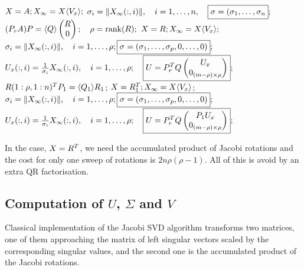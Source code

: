 \documentclass{article}
\begin{document}
\begin{algorithm}
  \caption{$(\sigma,U) = \texttt{svd}(A)$} \label{alg:svd-sv-lhsvec}
  \begin{algorithmic}[1]
    \State $X = A; X_{\infty} = X\langle V_x\rangle;$
    \State $\sigma_i = \|{X_{\infty}(:,i)}\|, \quad i = 1,\dots,n,\quad 
    \boxed{\sigma = (\sigma_1,\dots,\sigma_n};$
\Else
    \State $(P_rA)P = \langle Q\rangle \begin{pmatrix} R \\ 0 \end{pmatrix}; \quad
    \rho = \operatorname{rank}(R);$  
        \State $X = R; X_{\infty} = X\langle V_x\rangle;$
        \State $\sigma_i = \|{X_{\infty}(:,i)}\|, \quad i = 1,\dots,\rho; 
\boxed{\sigma = (\sigma_1,\dots,\sigma_p,0,\dots,0)};$ 
        \State $U_x(:,i) = \frac{1}{\sigma_i}X_{\infty}(:,i),\quad i =
        1,\dots,\rho; \quad \boxed{U = P_r^{T} Q
        \begin{pmatrix}
          U_x \\ 0_{(m-\rho) \times \rho}
        \end{pmatrix}};$
    \Else 
        \State $R(1:\rho,1:n)^TP_1 = \langle Q_1\rangle R_1$;
        \State $X = R_1^T; X_{\infty} = X\langle V_x\rangle$;
        \State $\sigma_i = \|{X_{\infty}(:,i)}\|, \quad i = 1,\dots,\rho; 
\boxed{\sigma = (\sigma_1,\dots,\sigma_p,0,\dots,0)};$ 
        \State $U_x(:,i) = \frac{1}{\sigma_i}X_{\infty}(:,i),\quad i =
        1,\dots,\rho; \quad \boxed{U = P_r^{T} Q
        \begin{pmatrix}
          P_1U_x \\ 0_{(m-\rho) \times \rho}
        \end{pmatrix}};$
    \EndIf
\EndIf
  \end{algorithmic}
\end{algorithm}
 In the case, $X = R^{T}$, we need the accumulated product of Jacobi
 rotations and the cost for only one sweep of rotations is $2n\rho(\rho -
 1)$. All of this is avoid by an extra QR factorisation.

\subsection{Computation of $U$, $\Sigma$ and $V$}

Classical implementation of the Jacobi SVD algorithm transforms two
matrices, one of them approaching the matrix of left singular vectors
scaled by the corresponding singular values, and the second one is the
accumulated product of the Jacobi rotations.
\end{document}
